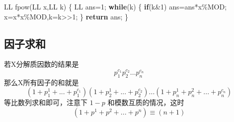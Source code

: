 \documentclass[
]{article}
\newenvironment{Shaded}{}{}
\newcommand{\ControlFlowTok}[1]{\textcolor[rgb]{0.00,0.44,0.13}{\textbf{#1}}}
\newcommand{\DecValTok}[1]{\textcolor[rgb]{0.25,0.63,0.44}{#1}}
\newcommand{\NormalTok}[1]{#1}
\begin{document}
\begin{Shaded}
\begin{Highlighting}[]
\NormalTok{LL fpow(LL x,LL k)}
\NormalTok{\{}
\NormalTok{    LL ans=}\DecValTok{1}\NormalTok{;}
    \ControlFlowTok{while}\NormalTok{(k)}
\NormalTok{    \{}
        \ControlFlowTok{if}\NormalTok{(k\&}\DecValTok{1}\NormalTok{) ans=ans*x\%MOD;}
\NormalTok{        x=x*x\%MOD,k=k\textgreater{}\textgreater{}}\DecValTok{1}\NormalTok{;}
\NormalTok{    \}}
    \ControlFlowTok{return}\NormalTok{ ans;}
\NormalTok{\}}
\end{Highlighting}
\end{Shaded}

\hypertarget{ux56e0ux5b50ux6c42ux548c}{%
\subsection{因子求和}\label{ux56e0ux5b50ux6c42ux548c}}

若X分解质因数的结果是 \[p_1^{c_1}p_2^{c_2}...p_n^{c_n}\]
那么X所有因子的和就是
\[(1+p_1^1+...+p_1^{c_1})(1+p_2^1+...+p_2^{c_2})...(1+p_n^1+p_n^2+...+p_n^{c_n})\]
等比数列求和即可，注意下 \(1-p\) 和模数互质的情况，这时
\[(1+p^1+p^2+...+p^n) \equiv  (n+1) \]
\end{document}
